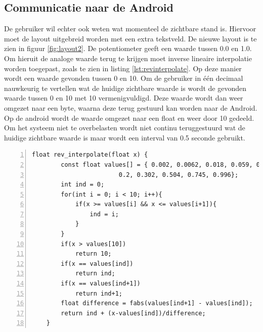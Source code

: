 \documentclass[a4paper]{article}
\begin{document}
		\subsection{Communicatie naar de Android}
			De gebruiker wil echter ook weten wat momenteel de zichtbare stand is. Hiervoor moet de layout uitgebreid worden met een extra tekstveld. De nieuwe layout is te zien in figuur \ref{fig:layout2}. De potentiometer geeft een waarde tussen 0.0 en 1.0. Om hieruit de analoge waarde terug te krijgen moet inverse lineaire interpolatie worden toegepast, zoals te zien in listing \ref{lst:revinterpolate}. Op deze manier wordt een waarde gevonden tussen 0 en 10. Om de gebruiker in \'e\'en decimaal nauwkeurig te vertellen wat de huidige zichtbare waarde is wordt de gevonden waarde tussen 0 en 10 met 10 vermenigvuldigd. Deze waarde wordt dan weer omgezet naar een byte, waarna deze terug gestuurd kan worden naar de Android. Op de android wordt de waarde omgezet naar een float en weer door 10 gedeeld. Om het systeem niet te overbelasten wordt niet continu teruggestuurd wat de huidige zichtbare waarde is maar wordt een interval van 0.5 seconde gebruikt.
	\begin{lstlisting}[caption=Linear Interpolation, label=lst:revinterpolate, numbers=left]
	float rev_interpolate(float x) {
		const float values[] = { 0.002, 0.0062, 0.018, 0.059, 0.105, 0.152,
					    0.2, 0.302, 0.504, 0.745, 0.996};
		int ind = 0;
		for(int i = 0; i < 10; i++){
			if(x >= values[i] && x <= values[i+1]){
				ind = i;
			}
		}
		if(x > values[10])
			return 10;
		if(x == values[ind])
			return ind;
		if(x == values[ind+1])
			return ind+1;
		float difference = fabs(values[ind+1] - values[ind]);
		return ind + (x-values[ind])/difference;
	}
	\end{lstlisting}
\end{document}

